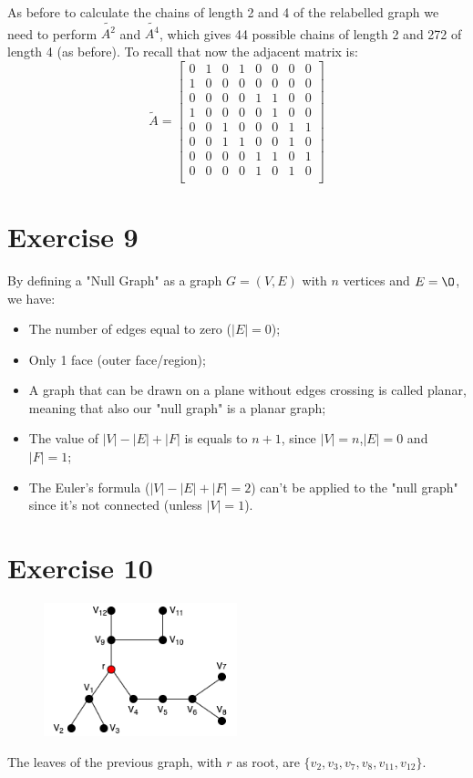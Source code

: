 \documentclass{article}
\begin{document}
    \noindent As before to calculate the chains of length 2 and 4 of the relabelled graph we need to perform \(\widetilde{A^{2}}\) and \(\widetilde{A^{4}}\), which gives 44 possible chains of length 2 and 272 of length 4 (as before). To recall that now the adjacent matrix is: 
    \[
    \widetilde{A}=
    \begin{bmatrix}
        0 & 1 & 0 & 1 & 0 & 0 & 0 & 0\\
        1 & 0 & 0 & 0 & 0 & 0 & 0 & 0\\
        0 & 0 & 0 & 0 & 1 & 1 & 0 & 0\\
        1 & 0 & 0 & 0 & 0 & 1 & 0 & 0\\
        0 & 0 & 1 & 0 & 0 & 0 & 1 & 1\\
        0 & 0 & 1 & 1 & 0 & 0 & 1 & 0\\
        0 & 0 & 0 & 0 & 1 & 1 & 0 & 1\\
        0 & 0 & 0 & 0 & 1 & 0 & 1 & 0\\
    \end{bmatrix}
    \]
    
\section{Exercise 9}
By defining a "Null Graph" as a graph \(G=(V,E)\) with \(n\) vertices and \(E = \O\), we have:

\begin{itemize}
    \item The number of edges equal to zero (\(|E|=0\));
    \item Only 1 face (outer face/region);
    \item A graph that can be drawn on a plane without edges crossing is called planar, meaning that also our "null graph" is a planar graph;
    \item The value of \(|V|-|E|+|F|\) is equals to \(n+1\), since \(|V|=n\),\(|E|=0\) and \(|F|=1\);
    \item The Euler's formula (\(|V|-|E|+|F|= 2\)) can't be applied to the "null graph" since it's not connected (unless \(|V|=1\)).
\end{itemize}

\section{Exercise 10}
    \begin{figure}[H]
        \centering
        \includegraphics[width=0.5\textwidth]{12.png}
        \label{fig:figure-9}
    \end{figure}
    
    The leaves of the previous graph, with \(r\) as root, are \(\{v_{2},v_{3},v_{7},v_{8},v_{11},v_{12}\}\).
    
\end{document}
